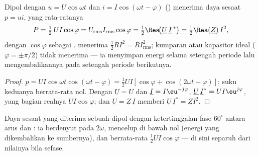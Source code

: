 \begin{theorem}\label{thm:b1:sinusoidal-impedance:power}
Dipol dengan $u = U\cos\omega t$ dan $i = I\cos(\omega t - \varphi)$
() menerima daya sesaat $p = ui$, yang rata-ratanya
\[
P = \tfrac12\,UI\cos\varphi = U_{\mathrm{rms}}I_{\mathrm{rms}}\cos\varphi
= \tfrac12\Rea\!\big(\underline U\,\underline I^{\,*}\big) = \tfrac12\Rea(\underline Z)\,I^2,
\]
dengan $\cos\varphi$ sebagai \emph{}.  menerima
$\tfrac12 RI^2 = RI_{\mathrm{rms}}^2$; kumparan atau kapasitor ideal
($\varphi = \pm\pi/2$) tidak menerima  --- ia menyimpan
energi selama setengah periode lalu mengembalikannya pada setengah
periode berikutnya.
\end{theorem}

\begin{proof}
$p = UI\cos\omega t\cos(\omega t - \varphi) = \tfrac12 UI[\cos\varphi +
\cos(2\omega t - \varphi)]$; suku keduanya berrata-rata nol. Dengan
$\underline U = U$ dan $\underline I = I\eu^{-j\varphi}$,
$\underline U\,\underline I^* = UI\eu^{j\varphi}$, yang bagian realnya
$UI\cos\varphi$; dan $\underline U = \underline Z\,\underline I$ memberi
$\underline U\,\underline I^* = \underline Z I^2$.
\end{proof}

\begin{omfigure}

{\small Daya sesaat yang diterima sebuah dipol dengan ketertinggalan
fase $60^\circ$ antara arus dan : ia berdenyut pada
$2\omega$, mencelup di bawah nol (energi yang dikembalikan ke sumbernya),
dan berrata-rata $\tfrac12 UI\cos\varphi$ --- di sini separuh dari
nilainya bila sefase.}
\end{omfigure}

